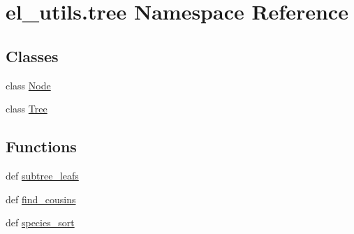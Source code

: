 \hypertarget{namespaceel__utils_1_1tree}{\section{el\-\_\-utils.\-tree Namespace Reference}
\label{namespaceel__utils_1_1tree}
}
\subsection*{Classes}
\begin{DoxyCompactItemize}
\item 
class \hyperlink{classel__utils_1_1tree_1_1Node}{Node}
\item 
class \hyperlink{classel__utils_1_1tree_1_1Tree}{Tree}
\end{DoxyCompactItemize}
\subsection*{Functions}
\begin{DoxyCompactItemize}
\item 
def \hyperlink{namespaceel__utils_1_1tree_a2680c7295de8070e79e1d94674e36ee1}{subtree\-\_\-leafs}
\item 
def \hyperlink{namespaceel__utils_1_1tree_a87a9bf34ae067869200b2f420df69489}{find\-\_\-cousins}
\item 
def \hyperlink{namespaceel__utils_1_1tree_a9aeb8e495468be1c9ea278f47a26a75f}{species\-\_\-sort}
\end{DoxyCompactItemize}


